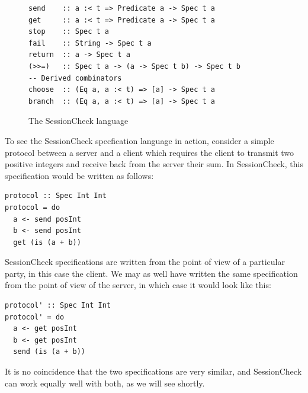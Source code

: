 \documentclass{article}
\begin{document}
\begin{figure}
  \begin{verbatim}
send    :: a :< t => Predicate a -> Spec t a
get     :: a :< t => Predicate a -> Spec t a
stop    :: Spec t a
fail    :: String -> Spec t a
return  :: a -> Spec t a
(>>=)   :: Spec t a -> (a -> Spec t b) -> Spec t b
-- Derived combinators
choose  :: (Eq a, a :< t) => [a] -> Spec t a
branch  :: (Eq a, a :< t) => [a] -> Spec t a
  \end{verbatim}
  \caption{\label{fig:SessionCheck:language} The SessionCheck language}
\end{figure}

To see the SessionCheck specfication language in action, consider a simple protocol between a server and a
client which requires the client to transmit two positive integers and receive back from the server their sum.
%
In SessionCheck, this specification would be written as follows:
%

\begin{verbatim}
protocol :: Spec Int Int
protocol = do
  a <- send posInt
  b <- send posInt
  get (is (a + b))
\end{verbatim}

%
SessionCheck specifications are written from the point of view of a particular party, in this case the client.
%
We may as well have written the same specification from the point of view of the server,
in which case it would look like this:
%

\begin{verbatim}
protocol' :: Spec Int Int
protocol' = do
  a <- get posInt
  b <- get posInt
  send (is (a + b))
\end{verbatim}

%
It is no coincidence that the two specifications are very similar, and SessionCheck can work equally well with
both, as we will see shortly.
\end{document}
